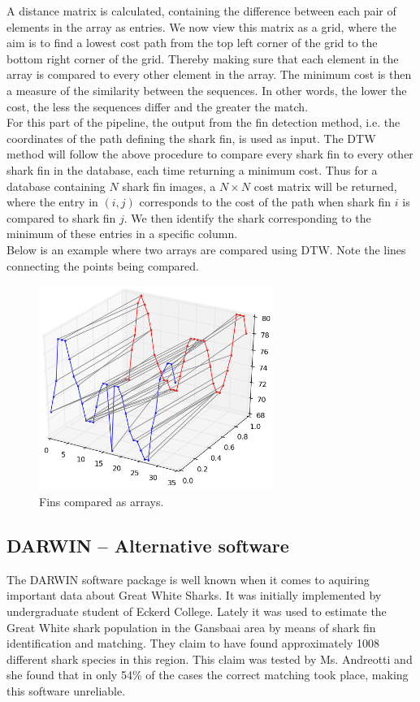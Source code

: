 \documentclass[a4paper,10pt]{article}
\newcommand{\note}{\todo}
\begin{document}
A distance matrix is calculated, containing the difference between
each pair of elements in the array as entries.  We now view this matrix as a
grid, where the
aim is to find a lowest cost path from the top left corner of the grid to the bottom right
corner of the grid.  Thereby making sure that each element in the array is compared to every other element in the array.
The minimum cost is then a measure of the similarity between the
sequences.
In other words, the lower the cost, the less the sequences differ and the greater the match.
\\

For this part of the pipeline, the output from the fin detection method,
\note{diagram! Van wat???}i.e.
the coordinates of the path defining the shark fin, is used as input.  The DTW
method will follow the above procedure to compare every shark fin to every
other shark fin in the database, each time returning a minimum cost.  
Thus for a database containing $N$ shark fin images, a $N \times N$ cost
matrix will be returned, where the entry in $(i, j)$ corresponds to the cost
of the path when shark fin $i$ is compared to shark fin $j$.  We then identify the shark
corresponding to the minimum of these entries in a specific column. \\


Below is an example where two arrays are compared using DTW. Note the lines
connecting the points being compared.  \begin{figure}[H]
 \centering
 \includegraphics[width=3in]{dtw.jpg}
 \caption{Fins compared as arrays.}
 \label{dtw}
\end{figure}

\newpage
\subsection{DARWIN -- Alternative software}
The DARWIN\cite{Darwin} software package is well known when it comes to
aquiring important data about Great White Sharks.  It was initially implemented
by undergraduate student of
Eckerd College.
Lately it was used to estimate the Great White shark population in the
Gansbaai area by means of shark fin identification and matching.  They claim to
have found approximately
1008 different shark species in this region.  This
claim was tested by Ms. Andreotti and she found that in only
54\% of the cases the correct matching took place, making this software
unreliable.
\end{document}
